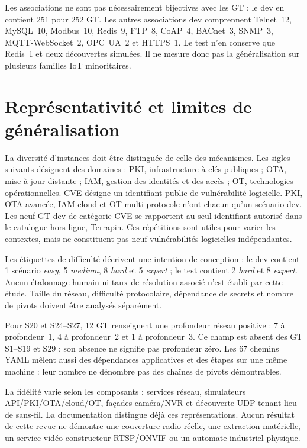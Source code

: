 \documentclass[11pt,a4paper]{article}
\begin{document}
Les associations ne sont pas nécessairement bijectives avec les GT : le dev en contient 251 pour 252 GT. Les autres associations dev comprennent Telnet~12, MySQL~10, Modbus~10, Redis~9, FTP~8, CoAP~4, BACnet~3, SNMP~3, MQTT-WebSocket~2, OPC~UA~2 et HTTPS~1. Le test n'en conserve que Redis~1 et deux découvertes simulées. Il ne mesure donc pas la généralisation sur plusieurs familles IoT minoritaires.

\section{Représentativité et limites de généralisation}
\label{sec:representativity}
La diversité d'instances doit être distinguée de celle des mécanismes.
Les sigles suivants désignent des domaines : PKI, infrastructure à clés
publiques ; OTA, mise à jour distante ; IAM, gestion des identités et des accès ;
OT, technologies opérationnelles. CVE désigne un identifiant public de
vulnérabilité logicielle. PKI, OTA avancée, IAM cloud et OT multi-protocole n'ont chacun qu'un scénario dev. Les neuf GT dev de catégorie CVE se rapportent au seul identifiant autorisé dans le catalogue hors ligne, Terrapin. Ces répétitions sont utiles pour varier les contextes, mais ne constituent pas neuf vulnérabilités logicielles indépendantes.

Les étiquettes de difficulté décrivent une intention de conception : le dev contient 1 scénario \emph{easy}, 5 \emph{medium}, 8 \emph{hard} et 5 \emph{expert} ; le test contient 2 \emph{hard} et 8 \emph{expert}. Aucun étalonnage humain ni taux de résolution associé n'est établi par cette étude. Taille du réseau, difficulté protocolaire, dépendance de secrets et nombre de pivots doivent être analysés séparément.

Pour S20 et S24--S27, 12 GT renseignent une profondeur réseau positive : 7 à profondeur~1, 4 à profondeur~2 et 1 à profondeur~3. Ce champ est absent des GT S1--S19 et S29 ; son absence ne signifie pas profondeur zéro. Les 67 chemins YAML mêlent aussi des dépendances applicatives et des étapes sur une même machine : leur nombre ne dénombre pas des chaînes de pivots démontrables.

La fidélité varie selon les composants : services réseau, simulateurs API/PKI/OTA/cloud/OT, façades caméra/NVR et découverte UDP tenant lieu de sans-fil. La documentation distingue déjà ces représentations. Aucun résultat de cette revue ne démontre une couverture radio réelle, une extraction matérielle, un service vidéo constructeur RTSP/ONVIF ou un automate industriel physique.
\end{document}
